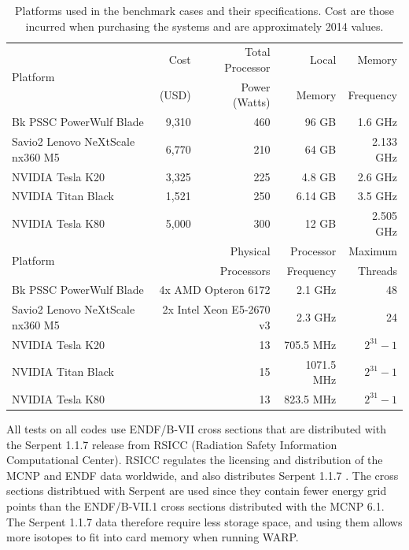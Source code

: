 \documentclass[preprint,12pt]{elsarticle}
\begin{document}
\begin{table}[h]
\centering
\caption{Platforms used in the benchmark cases and their specifications.  Cost are those incurred when purchasing the systems and are approximately 2014 values.}
\label{platform_table}
\small
\begin{tabular}{| l | r | r | r | r |}
\hline
\multirow{2}{*}{Platform} &  Cost   & Total Processor  & Local       & Memory     \\
                                       & (USD)  & Power (Watts) & Memory  & Frequency \\
\hline
Bk PSSC PowerWulf Blade       &    9,310   & 460 &  96 GB        &  1.6 GHz                    \\
\hline
Savio2 Lenovo NeXtScale nx360 M5       &   6,770    &  210  &  64 GB        & 2.133  GHz                    \\
\hline
NVIDIA Tesla K20         &    3,325     & 225 &  4.8  GB      &  2.6 GHz                  \\
\hline
NVIDIA Titan Black       &    1,521   & 250 &  6.14 GB        & 3.5 GHz              \\
\hline
NVIDIA Tesla K80       &    5,000    & 300 &  12 GB        &  2.505 GHz              \\
\hline
\hline
\hline
\multirow{2}{*}{Platform}  &  \multicolumn{2}{r|}{Physical }     & Processor  & Maximum \\
                                        & \multicolumn{2}{r|}{Processors}  & Frequency  & Threads \\
\hline
Bk PSSC PowerWulf Blade       &   \multicolumn{2}{r|}{4x AMD Opteron 6172 }  &  2.1 GHz     &  48           \\
\hline
Savio2 Lenovo NeXtScale nx360 M5   &   \multicolumn{2}{r|}{2x Intel Xeon E5-2670 v3}  &  2.3 GHz     &  24           \\
\hline
NVIDIA Tesla K20         &       \multicolumn{2}{r|}{13}   &  705.5 MHz     &  $2^{31}-1$           \\
\hline
NVIDIA Titan Black       &      \multicolumn{2}{r|}{ 15 }  &  1071.5 MHz     & $2^{31}-1$           \\
\hline
NVIDIA Tesla K80      &      \multicolumn{2}{r|}{ 13 }  &  823.5 MHz     & $2^{31}-1$           \\
\hline

\end{tabular}
\end{table}

All tests on all codes use ENDF/B-VII cross sections that are distributed with the Serpent 1.1.7 release from RSICC (Radiation Safety Information Computational Center).  RSICC regulates the licensing and distribution of the MCNP and ENDF data worldwide, and also distributes Serpent 1.1.7 \cite{serpdata}.  The cross sections distribtued with Serpent are used since they contain fewer energy grid points than the ENDF/B-VII.1 cross sections distributed with the MCNP 6.1.  The Serpent 1.1.7 data therefore require less storage space, and using them allows more isotopes to fit into card memory when running WARP.
\end{document}

